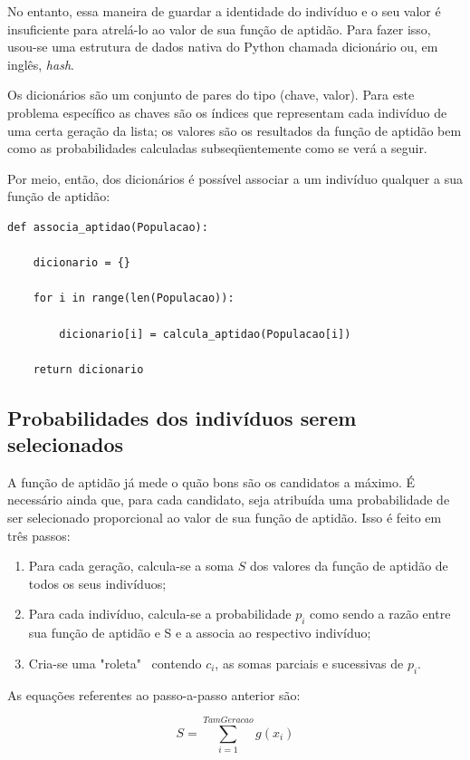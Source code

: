 \documentclass[11pt]{article}
\begin{document}
No entanto, essa maneira de guardar a identidade do indivíduo e o seu valor é insuficiente para atrelá-lo ao valor de sua função de aptidão. Para fazer isso, usou-se uma estrutura de dados nativa do Python chamada dicionário ou, em inglês, \emph{hash}.

Os dicionários são um conjunto de pares do tipo (chave, valor). Para este problema específico as chaves são os índices que representam cada indivíduo de uma certa geração da lista; os valores são os resultados da função de aptidão bem como as probabilidades calculadas subseqüentemente como se verá a seguir.

Por meio, então, dos dicionários é possível associar a um indivíduo qualquer a sua função de aptidão:

\begin{lstlisting}
def associa_aptidao(Populacao):	

	dicionario = {}

	for i in range(len(Populacao)):
		
		dicionario[i] = calcula_aptidao(Populacao[i])	

	return dicionario
\end{lstlisting}

\subsection{Probabilidades dos indivíduos serem selecionados}

A função de aptidão já mede o quão bons são os candidatos a máximo. É necessário ainda que, para cada candidato, seja atribuída uma probabilidade de ser selecionado proporcional ao valor de sua função de aptidão. Isso é feito em três passos:

\begin{enumerate}
\item Para cada geração, calcula-se a soma $S$ dos valores da função de aptidão de todos os seus indivíduos;
\item Para cada indivíduo, calcula-se a probabilidade $p_i$ como sendo a razão entre sua função de aptidão e S e a associa ao respectivo indivíduo;
\item Cria-se uma "roleta" \ contendo $c_i$, as somas parciais e sucessivas de $p_i$.
\end{enumerate}

As equações referentes ao passo-a-passo anterior são:

\begin{equation*}
S = \sum_{i = 1}^{TamGeracao} g(x_i)
\end{equation*}
\end{document}
